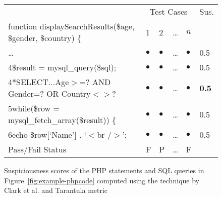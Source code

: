
\begin{figure}[t]
    \centering
    \small
    \setlength{\tabcolsep}{2pt}
    \renewcommand{\arraystretch}{1.1}
{\sffamily
\begin{tabular}{@{}llllll@{}}
    \toprule
                                                                                    & \multicolumn{4}{c}{Test Cases} & Sus.\\
                                                                                    \cmidrule{2-5}
    function displaySearchResults(\$age, \$gender, \$country) \{                    & 1         & 2         & \ldots         & $n$ \\
    \ldots                                                                          & $\bullet$ & $\bullet$ & \ldots    & $\bullet$ & 0.5\\
    4\hspace{5pt}\$result = mysql\_query(\$sql);                                   & $\bullet$ & $\bullet$ & \ldots    & $\bullet$ & 0.5\\
    4$\ast$\hspace{10pt}SELECT...Age$>$=? AND Gender=? OR Country$<>$?                  & $\bullet$ & $\bullet$ & \ldots    & $\bullet$ & \textbf{0.5}\\
    5\hspace{5pt}while(\$row = mysql\_fetch\_array(\$result)) \{                    & $\bullet$ & $\bullet$ & \ldots    & $\bullet$ & 0.5\\
    6\hspace{20pt}echo \$row[`Name'] . `$<$br /$>$';                                    & $\bullet$ & $\bullet$ & \ldots    & $\bullet$ & 0.5\\
    \midrule
    Pass/Fail Status                                                                & F       & P     & \ldots    & F \\
    \bottomrule
\end{tabular}
}
    \caption{Suspiciousness scores of the PHP statements and SQL queries in Figure~\ref{fig:example-phpcode} computed using the technique by Clark et al. and Tarantula metric~\cite{icsm13}}\label{fig:suspiciousness}
\end{figure}

